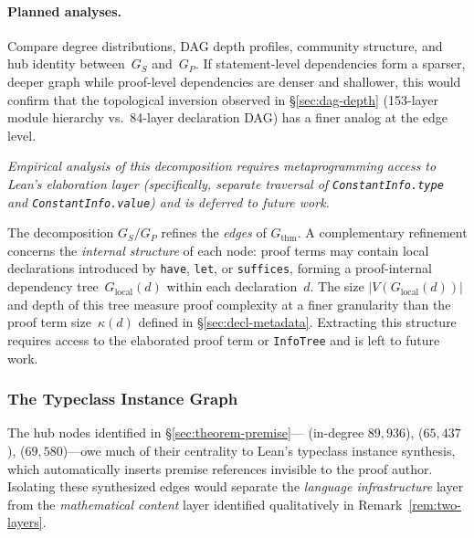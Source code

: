 \paragraph{Planned analyses.}
Compare degree distributions, DAG depth profiles, community structure, and hub identity between~$G_S$ and~$G_P$. If statement-level dependencies form a sparser, deeper graph while proof-level dependencies are denser and shallower, this would confirm that the topological inversion observed in \S\ref{sec:dag-depth} (153-layer module hierarchy vs.\ 84-layer declaration DAG) has a finer analog at the edge level.

\emph{Empirical analysis of this decomposition requires metaprogramming access to Lean's elaboration layer (specifically, separate traversal of \texttt{ConstantInfo.type} and \texttt{ConstantInfo.value}) and is deferred to future work.}

\begin{remark}\label{rem:local-deps}
The decomposition $G_S / G_P$ refines the \emph{edges} of $G_{\mathrm{thm}}$. A complementary refinement concerns the \emph{internal structure} of each node: proof terms may contain local declarations introduced by \texttt{have}, \texttt{let}, or \texttt{suffices}, forming a proof-internal dependency tree~$G_{\mathrm{local}}(d)$ within each declaration~$d$. The size $|V(G_{\mathrm{local}}(d))|$ and depth of this tree measure proof complexity at a finer granularity than the proof term size~$\kappa(d)$ defined in \S\ref{sec:decl-metadata}. Extracting this structure requires access to the elaborated proof term or \texttt{InfoTree} and is left to future work.
\end{remark}

\subsubsection{The Typeclass Instance Graph}
\label{sec:typeclass-graph}

The hub nodes identified in \S\ref{sec:theorem-premise}--- (in-degree $89{,}936$),  ($65{,}437$),  ($69{,}580$)---owe much of their centrality to Lean's typeclass instance synthesis, which automatically inserts premise references invisible to the proof author. Isolating these synthesized edges would separate the \emph{language infrastructure} layer from the \emph{mathematical content} layer identified qualitatively in Remark~\ref{rem:two-layers}.

